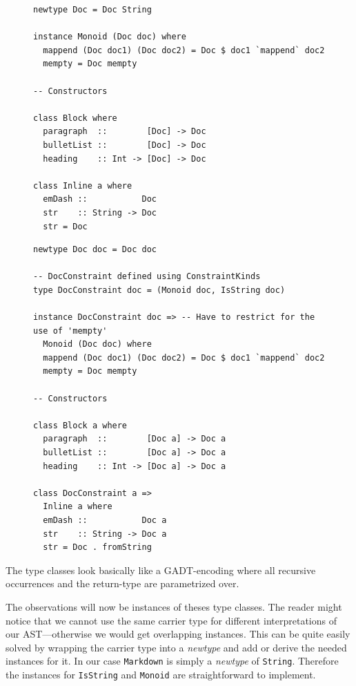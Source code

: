 \begin{figure}
\begin{lstlisting}
newtype Doc = Doc String

instance Monoid (Doc doc) where
  mappend (Doc doc1) (Doc doc2) = Doc $ doc1 `mappend` doc2
  mempty = Doc mempty

-- Constructors

class Block where
  paragraph  ::        [Doc] -> Doc
  bulletList ::        [Doc] -> Doc
  heading    :: Int -> [Doc] -> Doc

class Inline a where
  emDash ::           Doc
  str    :: String -> Doc
  str = Doc
\end{lstlisting}
\end{figure}

\begin{figure}
\begin{lstlisting}
newtype Doc doc = Doc doc

-- DocConstraint defined using ConstraintKinds
type DocConstraint doc = (Monoid doc, IsString doc)

instance DocConstraint doc => -- Have to restrict for the use of 'mempty'
  Monoid (Doc doc) where
  mappend (Doc doc1) (Doc doc2) = Doc $ doc1 `mappend` doc2
  mempty = Doc mempty

-- Constructors

class Block a where
  paragraph  ::        [Doc a] -> Doc a
  bulletList ::        [Doc a] -> Doc a
  heading    :: Int -> [Doc a] -> Doc a

class DocConstraint a =>
  Inline a where
  emDash ::           Doc a
  str    :: String -> Doc a
  str = Doc . fromString
\end{lstlisting}
\end{figure}

The type classes look basically like a GADT-encoding where all recursive
occurrences and the return-type are parametrized over.

The observations will now be instances of theses type classes. The reader might
notice that we cannot use the same carrier type for different interpretations of
our AST—otherwise we would get overlapping instances. This can be quite easily
solved by wrapping the carrier type into a \emph{newtype} and add or derive the
needed instances for it. In our case \texttt{Markdown} is simply a
\emph{newtype} of \texttt{String}. Therefore the instances for \texttt{IsString}
and \texttt{Monoid} are straightforward to implement.

